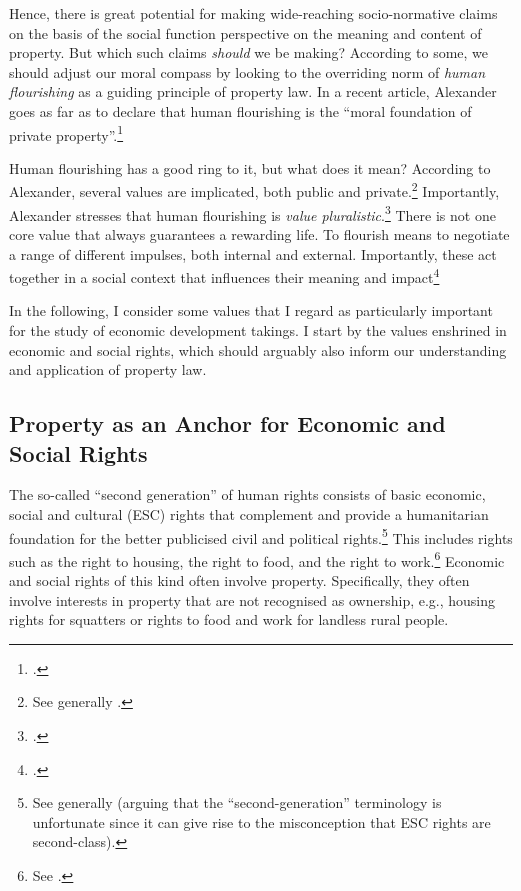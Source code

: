 Hence, there is great potential for making wide-reaching socio-normative claims on the basis of the social function perspective on the meaning and content of property. But which such claims {\it should} we be making? According to some, we should adjust our moral compass by looking to the overriding norm of {\it human flourishing} as a guiding principle of property law. In a recent article, Alexander goes as far as to declare that human flourishing is the ``moral foundation of private property''.\footcite[1261]{alexander14} 

Human flourishing has a good ring to it, but what does it mean? According to Alexander, several values are implicated, both public and private.\footnote{See generally \cite{alexander14,alexander11}.} Importantly, Alexander stresses that human flourishing is {\it value pluralistic}.\footnote{\cite[750-751]{alexander09}.} There is not one core value that always guarantees a rewarding life. To flourish means to negotiate a range of different impulses, both internal and external. Importantly, these act together in a social context that influences their meaning and impact\footcite[1035-1052]{alexander11}

In the following, I consider some values that I regard as particularly important for the study of economic development takings. I start by the values enshrined in economic and social rights, which should arguably also inform our understanding and application of property law.

\subsection{Property as an Anchor for Economic and Social Rights}


The so-called ``second generation'' of human rights consists of basic economic, social and cultural (ESC) rights that complement and provide a humanitarian foundation for the better publicised civil and political rights.\footnote{See generally \cite[1-14]{baderin07} (arguing that the ``second-generation'' terminology is unfortunate since it can give rise to the misconception that ESC rights are second-class).} This includes rights such as the right to housing, the right to food, and the right to work.\footnote{See \cite[6|7|11]{fnp}.} Economic and social rights of this kind often involve property. Specifically, they often involve interests in property that are not recognised as ownership, e.g., housing rights for squatters or rights to food and work for landless rural people.

